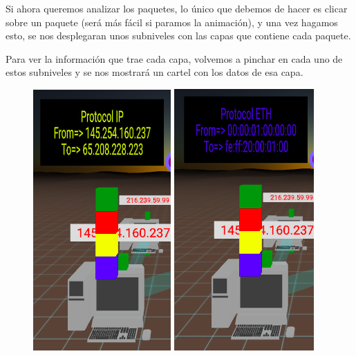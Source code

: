 \documentclass[a4paper, 12pt]{book}
\begin{document}
Si ahora queremos analizar los paquetes, lo único que debemos de hacer es clicar sobre un paquete (será más fácil si paramos la animación), y una vez hagamos esto, se nos desplegaran unos subniveles con las capas que contiene cada paquete.

Para ver la información que trae cada capa, volvemos a pinchar en cada uno de estos subniveles y se nos mostrará un cartel con los datos de esa capa.

\begin{figure}[h]
\centering
    \includegraphics[scale=0.45]{img/capa_ip.png}
    \includegraphics[scale=0.45]{img/capa_eth.png}

\end{figure}
\end{document}

